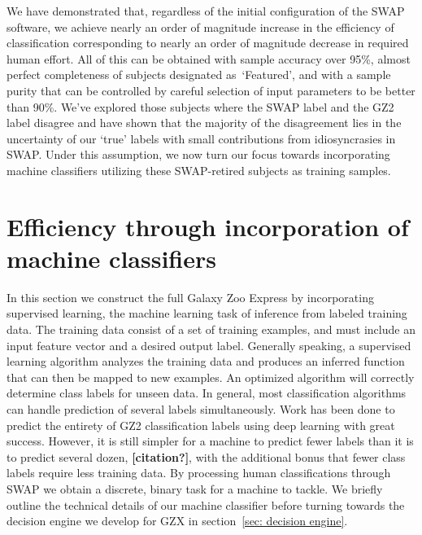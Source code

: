 \documentclass[twocolumn]{aastex6}
\newcommand{\feat}{`Featured'}
\begin{document}
We have demonstrated that, regardless of the initial configuration of the SWAP 
software, we achieve nearly an order of magnitude increase in the efficiency of 
classification corresponding to nearly an order of magnitude decrease in
required human effort. All of this can be obtained with sample accuracy over 95\%, 
almost perfect completeness of subjects designated as~\feat, and with a sample purity
that can be controlled by careful selection of input parameters to be better than 90\%. 
We've explored those subjects where the SWAP label and the GZ2 label disagree
and have shown that the majority of the disagreement lies in the uncertainty of 
our `true' labels with small contributions from idiosyncrasies in SWAP. 
Under this assumption, we now turn our focus towards incorporating machine
classifiers utilizing these SWAP-retired subjects as training samples. 


\section{Efficiency through incorporation of machine classifiers} \label{sec: machine}

In this section we construct the full Galaxy Zoo Express by incorporating supervised 
learning, the machine learning task of inference from labeled training data. 
The training data consist of a set of training examples, and must include
an input feature vector and a desired output label.  Generally speaking,
a supervised learning algorithm analyzes the training data and produces an inferred 
function that can then be mapped to new examples. An optimized algorithm will 
correctly determine class labels for unseen data. In general, most classification 
algorithms can handle prediction of several labels simultaneously. Work has been
done to predict the entirety of GZ2 classification labels using deep learning 
\citep{Dieleman2015} with great success. However, it is still simpler for a machine
to predict fewer labels than it is to predict several dozen, \textbf{[citation?]}, 
with the additional bonus that fewer class labels require less training data. 
By processing human classifications through SWAP we obtain a discrete, binary task
for a machine to tackle. We briefly outline the technical details of our machine
classifier before turning towards the decision engine we develop for GZX in 
section~\ref{sec: decision engine}. 
\end{document}
